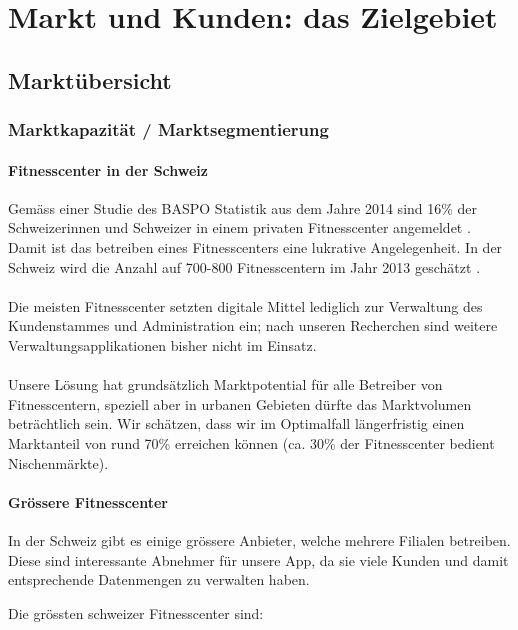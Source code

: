 \clearpage
\section{Markt und Kunden: das Zielgebiet}

\subsection{Marktübersicht}

\subsubsection{Marktkapazität / Marktsegmentierung}\label{sec:marktkapazitat}

\paragraph{Fitnesscenter in der Schweiz}
Gemäss einer Studie des BASPO Statistik aus dem Jahre 2014 sind 16\% der Schweizerinnen und Schweizer in einem privaten Fitnesscenter angemeldet \cite{schweizer+fitness}. Damit ist das betreiben eines Fitnesscenters eine lukrative Angelegenheit. In der Schweiz wird die Anzahl auf 700-800 Fitnesscentern im Jahr 2013 geschätzt \cite{fitness-studios+1+milliarde}\cite{fitness+tribune}. \\ \\
Die meisten Fitnesscenter setzten digitale Mittel lediglich zur Verwaltung des Kundenstammes und Administration ein; nach unseren Recherchen sind weitere Verwaltungsapplikationen bisher nicht im Einsatz. \\ \\
Unsere Lösung hat grundsätzlich Marktpotential für alle Betreiber von Fitnesscentern, speziell aber in urbanen Gebieten dürfte das Marktvolumen beträchtlich sein. Wir schätzen, dass wir im Optimalfall längerfristig einen Marktanteil von rund 70\% erreichen können (ca. 30\% der Fitnesscenter bedient Nischenmärkte).

\paragraph{Grössere Fitnesscenter}
In der Schweiz gibt es einige grössere Anbieter, welche mehrere Filialen betreiben. Diese sind interessante Abnehmer für unsere App, da sie viele Kunden und damit entsprechende Datenmengen zu verwalten haben.

Die grössten schweizer Fitnesscenter sind\cite{fitness+tribune}:

